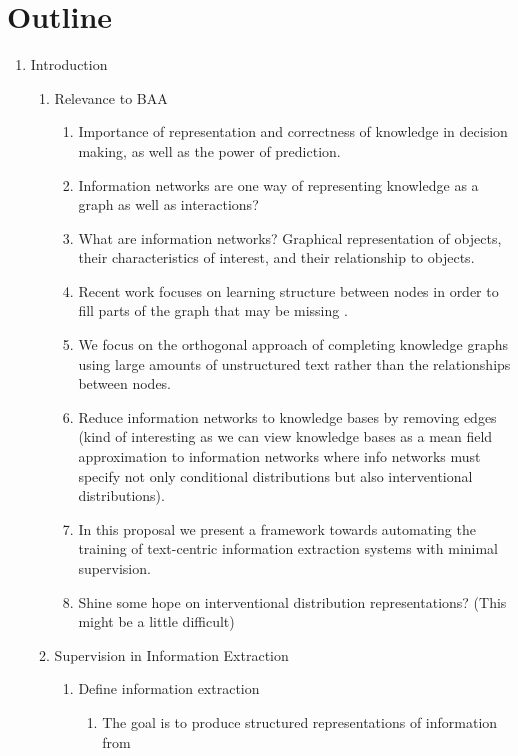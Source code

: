\documentclass[12pt]{article}
\begin{document}
\section*{Outline}
\begin{enumerate}
\item Introduction
    \begin{enumerate}
    \item Relevance to BAA
        \begin{enumerate}
        \item Importance of representation and correctness of knowledge in decision making,
            as well as the power of prediction.
        \item Information networks are one way of representing knowledge as a graph
            as well as interactions?
        \item What are information networks?
            Graphical representation of objects, their characteristics of interest,
            and their relationship to objects.
        \item Recent work focuses on learning structure between nodes
            in order to fill parts of the graph that may be missing \cite{chen2018diva}.
        \item We focus on the orthogonal approach of completing knowledge graphs using
            large amounts of unstructured text rather than the relationships between nodes.
        \item Reduce information networks to knowledge bases by removing edges
            (kind of interesting as we can view knowledge bases as a mean field approximation
            to information networks where info networks must specify not only
            conditional distributions but also interventional distributions).
        \item In this proposal we present a framework towards automating the
            training of text-centric information extraction systems with minimal supervision.
        \item Shine some hope on interventional distribution representations?
            (This might be a little difficult)
        \end{enumerate}
    \item Supervision in Information Extraction
        \begin{enumerate}
        \item Define information extraction
            \begin{enumerate}
            \item The goal is to produce structured representations of information from

\end{enumerate}
\end{enumerate}
\end{enumerate}
\end{enumerate}
\end{document}
